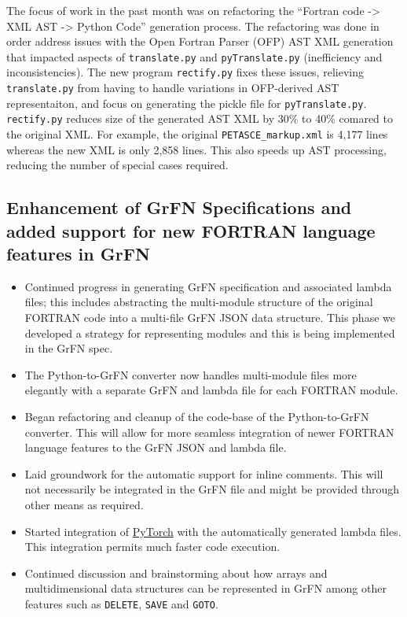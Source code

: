 \documentclass[article, 12pt, oneside]{memoir}
\begin{document}
The focus of work in the past month was on refactoring the ``Fortran
code -\textgreater{} XML AST -\textgreater{} Python Code'' generation
process. The refactoring was done in order address issues with the Open
Fortran Parser (OFP) AST XML generation that impacted aspects of
\texttt{translate.py} and \texttt{pyTranslate.py} (inefficiency and
inconsistencies). The new program \texttt{rectify.py} fixes these
issues, relieving \texttt{translate.py} from having to handle variations
in OFP-derived AST representaiton, and focus on generating the pickle
file for \texttt{pyTranslate.py}. \texttt{rectify.py} reduces size of
the generated AST XML by 30\% to 40\% comared to the original XML. For
example, the original \texttt{PETASCE\_markup.xml} is 4,177 lines
whereas the new XML is only 2,858 lines. This also speeds up AST
processing, reducing the number of special cases required.

\hypertarget{enhancement-of-grfn-specifications-and-added-support-for-new-fortran-language-features-in-grfn}{%
\subsection{Enhancement of GrFN Specifications and added support for new
FORTRAN language features in
GrFN}\label{enhancement-of-grfn-specifications-and-added-support-for-new-fortran-language-features-in-grfn}}

\begin{itemize}
\tightlist
\item
  Continued progress in generating GrFN specification and associated
  lambda files; this includes abstracting the multi-module structure of
  the original FORTRAN code into a multi-file GrFN JSON data structure.
  This phase we developed a strategy for representing modules and this
  is being implemented in the GrFN spec.
\item
  The Python-to-GrFN converter now handles multi-module files more
  elegantly with a separate GrFN and lambda file for each FORTRAN
  module.
\item
  Began refactoring and cleanup of the code-base of the Python-to-GrFN
  converter. This will allow for more seamless integration of newer
  FORTRAN language features to the GrFN JSON and lambda file.
\item
  Laid groundwork for the automatic support for inline comments. This
  will not necessarily be integrated in the GrFN file and might be
  provided through other means as required.
\item
  Started integration of \href{https://pytorch.org/}{PyTorch} with the
  automatically generated lambda files. This integration permits much
  faster code execution.
\item
  Continued discussion and brainstorming about how arrays and
  multidimensional data structures can be represented in GrFN among
  other features such as \texttt{DELETE}, \texttt{SAVE} and
  \texttt{GOTO}.
\end{itemize}
\end{document}
